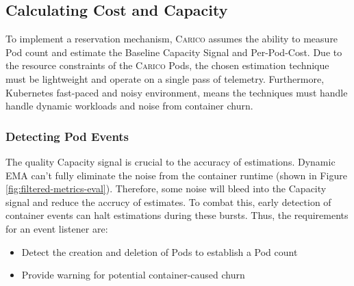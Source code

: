 \subsection{Calculating Cost and Capacity}
To implement a reservation mechanism, \textsc{Carico} assumes the ability to
measure Pod count and estimate the Baseline Capacity Signal and Per-Pod-Cost.
Due to the resource constraints of the \textsc{Carico} Pods, the chosen
estimation technique must be lightweight and operate on a single pass of
telemetry. Furthermore, Kubernetes fast-paced and noisy environment, means the
techniques must handle handle dynamic workloads and noise from container churn.

\subsubsection{Detecting Pod Events}
\label{sec:listeners-comparison}
The quality Capacity signal is crucial to the accuracy of estimations. Dynamic
EMA can't fully eliminate the noise from the container runtime (shown in Figure
\ref{fig:filtered-metrics-eval}). Therefore, some noise will bleed into the
Capacity signal and reduce the accrucy of estimates. To combat this, early
detection of container events can halt estimations during these bursts. Thus,
the requirements for an event listener are:
\begin{itemize}
    \item Detect the creation and deletion of Pods to establish a Pod count
    \item Provide warning for potential container-caused churn
\end{itemize}

